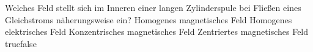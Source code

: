     {Welches Feld stellt sich im Inneren einer langen Zylinderspule bei Fließen eines Gleichstroms näherungsweise ein?}
    {Homogenes magnetisches Feld}
    {Homogenes elektrisches Feld}
    {Konzentrisches magnetisches Feld}
    {Zentriertes magnetisches Feld}
    {true}{false}